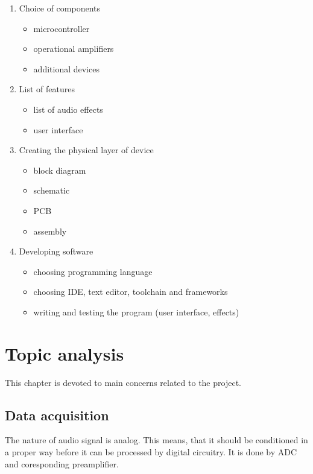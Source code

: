 \documentclass[a4paper,twoside,12pt]{book}
\begin{document}
\begin{enumerate}
    \item Choice of components
    \begin{itemize}
        \item microcontroller
        \item operational amplifiers
        \item additional devices
    \end{itemize}

    \item List of features
    \begin{itemize}
        \item list of audio effects
        \item user interface
    \end{itemize}

    \item Creating the physical layer of device
    \begin{itemize}
        \item block diagram
        \item schematic
        \item PCB
        \item assembly 
    \end{itemize}

    \item Developing software
    \begin{itemize}
        \item choosing programming language
        \item choosing IDE, text editor, toolchain and frameworks
        \item writing and testing the program (user interface, effects)
    \end{itemize}
\end{enumerate}




\chapter{Topic analysis}
This chapter is devoted to main concerns related to the project.

\section{Data acquisition}
The nature of audio signal is analog. This means,
that it should be conditioned in a proper way before it can be processed by digital circuitry.
It is done by ADC and coresponding preamplifier.
\end{document}
